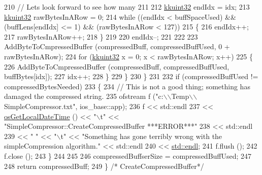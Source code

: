\begin{DoxyCode}
210       \textcolor{comment}{// Lets look forward to see how many}
211 
212       \hyperlink{namespace_k_k_b_af8d832f05c54994a1cce25bd5743e19a}{kkuint32}  endIdx = idx;
213       \hyperlink{namespace_k_k_b_af8d832f05c54994a1cce25bd5743e19a}{kkuint32}  rawBytesInARow = 0;
214       \textcolor{keywordflow}{while}  ((endIdx < buffSpaceUsed)  &&  (buffLens[endIdx] <= 1)  &&  (rawBytesInARow < 127))
215       \{
216         endIdx++;
217         rawBytesInARow++;
218       \}
219 
220       endIdx--;
221 
222       
223       AddByteToCmpressedBuffer (compressedBuff, compressedBuffUsed, 0 + rawBytesInARow);
224       \textcolor{keywordflow}{for}  (\hyperlink{namespace_k_k_b_af8d832f05c54994a1cce25bd5743e19a}{kkuint32} x = 0;   x < rawBytesInARow;  x++)
225       \{
226         AddByteToCmpressedBuffer (compressedBuff, compressedBuffUsed, buffBytes[idx]);
227         idx++;
228       \}
229     \}
230   \}
231 
232   \textcolor{keywordflow}{if}  (compressedBuffUsed != compressedBytesNeeded)
233   \{
234     \textcolor{comment}{// This is not a good thing; something has damaged the compressed string.}
235     ofstream  f (\textcolor{stringliteral}{"c:\(\backslash\)\(\backslash\)Temp\(\backslash\)\(\backslash\)SimpleCompressor.txt"}, ios\_base::app);
236     f << std::endl
237       << \hyperlink{namespace_k_k_b_af54c205cde0465bcb2c74f3881a96413}{osGetLocalDateTime} () << \textcolor{stringliteral}{"\(\backslash\)t"} << \textcolor{stringliteral}{"SimpleCompressor::CreateCompressedBuffer   
       ***ERROR***"}
238       << std::endl
239       << \textcolor{stringliteral}{"               "}     << \textcolor{stringliteral}{"\(\backslash\)t"} << \textcolor{stringliteral}{"Something has gone terribly wrong with the simpleCompression
       algorithm."} << std::endl
240       << \hyperlink{namespace_k_k_b_ad1f50f65af6adc8fa9e6f62d007818a8}{std::endl};
241     f.flush ();
242     f.close ();
243   \}
244 
245 
246   compressedBuffserSize = compressedBuffUsed;
247 
248   \textcolor{keywordflow}{return}  compressedBuff;
249 \}   \textcolor{comment}{/* CreateCompressedBuffer*/}
\end{DoxyCode}

